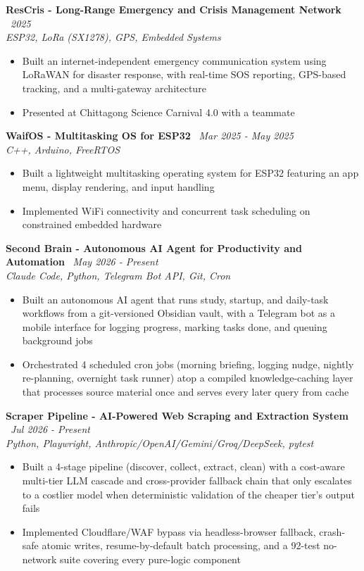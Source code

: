 \documentclass[10.5pt,a4paper]{article}
\newenvironment{tightitemize}{
  \begin{itemize}[leftmargin=15pt, itemsep=1pt, parsep=0pt, topsep=2pt]
}{
  \end{itemize}
}
\newcommand{\entrysimple}[2]{%
  \textbf{#1} \textbar\ \textit{#2}\\[1pt]
}
\begin{document}
\entrysimple{ResCris - Long-Range Emergency and Crisis Management Network}{2025}
\textit{ESP32, LoRa (SX1278), GPS, Embedded Systems}
\begin{tightitemize}
  \item Built an internet-independent emergency communication system using LoRaWAN for disaster response, with real-time SOS reporting, GPS-based tracking, and a multi-gateway architecture
  \item Presented at Chittagong Science Carnival 4.0 with a teammate
\end{tightitemize}

\entrysimple{WaifOS - Multitasking OS for ESP32}{Mar 2025 - May 2025}
\textit{C++, Arduino, FreeRTOS}
\begin{tightitemize}
  \item Built a lightweight multitasking operating system for ESP32 featuring an app menu, display rendering, and input handling
  \item Implemented WiFi connectivity and concurrent task scheduling on constrained embedded hardware
\end{tightitemize}

\newpage

\entrysimple{Second Brain - Autonomous AI Agent for Productivity and Automation}{May 2026 - Present}
\textit{Claude Code, Python, Telegram Bot API, Git, Cron}
\begin{tightitemize}
  \item Built an autonomous AI agent that runs study, startup, and daily-task workflows from a git-versioned Obsidian vault, with a Telegram bot as a mobile interface for logging progress, marking tasks done, and queuing background jobs
  \item Orchestrated 4 scheduled cron jobs (morning briefing, logging nudge, nightly re-planning, overnight task runner) atop a compiled knowledge-caching layer that processes source material once and serves every later query from cache
\end{tightitemize}

\entrysimple{Scraper Pipeline - AI-Powered Web Scraping and Extraction System}{Jul 2026 - Present}
\textit{Python, Playwright, Anthropic/OpenAI/Gemini/Groq/DeepSeek, pytest}
\begin{tightitemize}
  \item Built a 4-stage pipeline (discover, collect, extract, clean) with a cost-aware multi-tier LLM cascade and cross-provider fallback chain that only escalates to a costlier model when deterministic validation of the cheaper tier's output fails
  \item Implemented Cloudflare/WAF bypass via headless-browser fallback, crash-safe atomic writes, resume-by-default batch processing, and a 92-test no-network suite covering every pure-logic component
\end{tightitemize}
\end{document}
